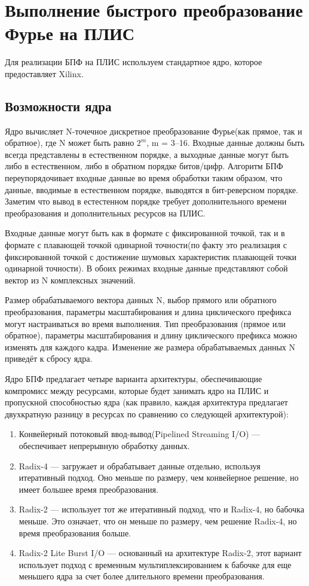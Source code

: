 \section{Выполнение быстрого преобразование Фурье на ПЛИС}

Для реализации БПФ на ПЛИС используем стандартное ядро, которое предоставляет Xilinx.

\subsection{Возможности ядра}

Ядро вычисляет N-точечное дискретное преобразование Фурье(как прямое, так и обратное), где N может быть равно $2^m$, m = 3–16. Входные данные должны быть всегда представлены в естественном порядке, а выходные данные могут быть либо в естественном, либо в обратном порядке битов/цифр. Алгоритм БПФ переупорядочивает входные данные во время обработки таким образом, что данные, вводимые в естественном порядке, выводятся в бит-реверсном порядке. Заметим что вывод в естестенном порядке требует дополнительного времени преобразования и дополнительных ресурсов на ПЛИС.  

Входные данные могут быть как в формате с фиксированной точкой, так и в формате с плавающей точкой одинарной точности(по факту это реализация с фиксированной точкой с достижение шумовых характеристик плавающей точки одинарной точности). В обоих режимах входные данные представляют собой вектор из N комплексных значений. 

Размер обрабатываемого вектора данных N, выбор прямого или обратного преобразования, параметры масштабирования и длина циклического префикса могут настраиваться во время выполнения. Тип преобразования (прямое или обратное), параметры масштабирования и длину циклического префикса можно изменять для каждого кадра. Изменение же размера обрабатываемых данных N приведёт к сбросу ядра. 

Ядро БПФ предлагает четыре варианта архитектуры, обеспечивающие компромисс между ресурсами, которые будет занимать ядро на ПЛИС и пропускной способностью ядра (как правило, каждая архитектура предлагает двухкратную разницу в ресурсах по сравнению со следующей архитектурой): 

\begin{enumerate}
	\item Конвейерный потоковый ввод-вывод(Pipelined Streaming I/O) — обеспечивает непрерывную обработку данных. 
	\item Radix-4 — загружает и обрабатывает данные отдельно, используя итеративный подход. Оно меньше по размеру, чем конвейерное решение, но имеет большее время преобразования. 
	\item Radix-2 — использует тот же итеративный подход, что и Radix-4, но бабочка меньше. Это означает, что он меньше по размеру, чем решение Radix-4, но время преобразования больше. 
	\item Radix-2 Lite Burst I/O — основанный на архитектуре Radix-2, этот вариант использует подход с временным мультиплексированием к бабочке для еще меньшего ядра за счет более длительного времени преобразования.
\end{enumerate} 

